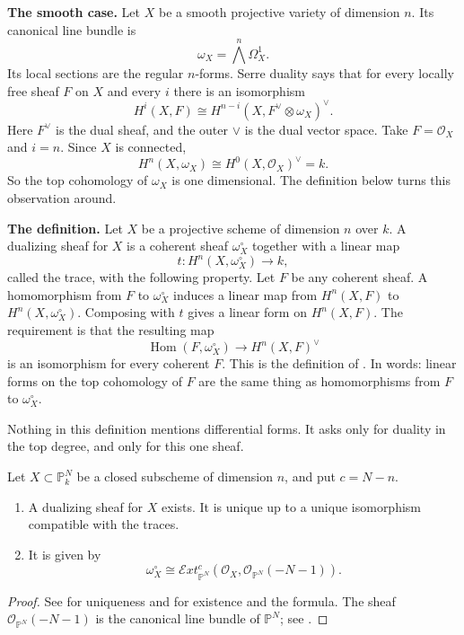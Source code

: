 \medskip\noindent
{\bf The smooth case.}
Let $X$ be a smooth projective variety of
dimension $n$. Its canonical line bundle
is
$$
\omega_X=\bigwedge^n\Omega^1_X.
$$
Its local sections are the regular
$n$-forms. Serre duality says that for
every locally free sheaf $F$ on $X$ and
every $i$ there is an isomorphism
$$
H^i(X,F)\cong
H^{n-i}(X,F^\vee\otimes\omega_X)^\vee.
$$
Here $F^\vee$ is the dual sheaf, and the
outer $\vee$ is the dual vector space.
Take $F=\mathcal{O}_X$ and $i=n$. Since
$X$ is connected,
$$
H^n(X,\omega_X)\cong
H^0(X,\mathcal{O}_X)^\vee=k.
$$
So the top cohomology of $\omega_X$ is one
dimensional. The definition below turns
this observation around.

\medskip\noindent
{\bf The definition.}
Let $X$ be a projective scheme of
dimension $n$ over $k$. A dualizing sheaf
for $X$ is a coherent sheaf
$\omega_X^\circ$ together with a linear
map
$$
t:H^n(X,\omega_X^\circ)\to k,
$$
called the trace, with the following
property. Let $F$ be any coherent sheaf.
A homomorphism from $F$ to
$\omega_X^\circ$ induces a linear map
from $H^n(X,F)$ to
$H^n(X,\omega_X^\circ)$. Composing with
$t$ gives a linear form on $H^n(X,F)$.
The requirement is that the resulting map
$$
\operatorname{Hom}(F,\omega_X^\circ)
\to H^n(X,F)^\vee
$$
is an isomorphism for every coherent $F$.
This is the definition of
\cite[Section III.7]{har}. In words:
linear forms on the top cohomology of $F$
are the same thing as homomorphisms from
$F$ to $\omega_X^\circ$.

Nothing in this definition mentions
differential forms. It asks only for
duality in the top degree, and only for
this one sheaf.

\begin{theorem}
\label{theorem-dualizing-sheaf-exists}
Let $X\subset\mathbb{P}^N_k$ be a closed
subscheme of dimension $n$, and put
$c=N-n$.
\begin{enumerate}
\item A dualizing sheaf for $X$ exists. It
is unique up to a unique isomorphism
compatible with the traces.
\item It is given by
$$
\omega_X^\circ\cong
\mathcal{E}xt^{c}_{\mathbb{P}^N}
(\mathcal{O}_X,
\mathcal{O}_{\mathbb{P}^N}(-N-1)).
$$
\end{enumerate}
\end{theorem}

\begin{proof}
See \cite[III, Proposition 7.2]{har} for
uniqueness and
\cite[III, Proposition 7.5]{har} for
existence and the formula. The sheaf
$\mathcal{O}_{\mathbb{P}^N}(-N-1)$ is the
canonical line bundle of
$\mathbb{P}^N$; see
\cite[II, Example 8.20.1]{har}.
\end{proof}

